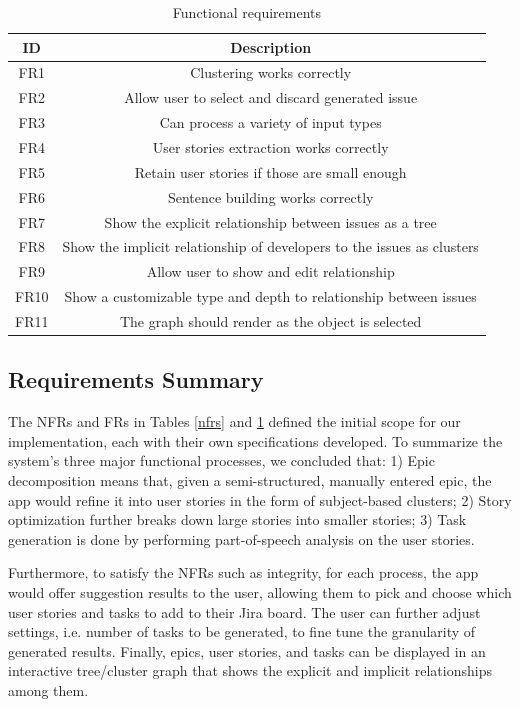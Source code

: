 \begin{table}
\centering
\caption{Functional requirements}
\label{frt}
\begin{tabular}{ |c|c| } 
\hline
\multicolumn{1}{|c|}{\textbf{ID}} & \multicolumn{1}{c|}{\textbf{Description}} \\
\hline
FR1 & Clustering works correctly \\
\hline
FR2 & Allow user to select and discard generated issue \\
\hline
FR3 & Can process a variety of input types \\
\hline
FR4 & User stories extraction works correctly \\
\hline
FR5 & Retain user stories if those are small enough \\
\hline
FR6 & Sentence building works correctly \\
\hline
FR7 & Show the explicit relationship between issues as a tree \\
\hline
FR8 & Show the implicit relationship of developers to the issues as clusters \\
\hline
FR9 & Allow user to show and edit relationship \\
\hline
FR10 & Show a customizable type and depth to relationship between issues \\
\hline
FR11 & The graph should render as the object is selected \\
\hline
\end{tabular}
\end{table}

\subsection{Requirements Summary}
The NFRs and FRs in Tables \ref{nfrs} and \ref{frt} defined the initial scope for our implementation, each with their own specifications developed. To summarize the system's three major functional processes, we concluded that: 1) Epic decomposition means that, given a semi-structured, manually entered epic, the app would refine it into user stories in the form of subject-based clusters; 2) Story optimization further breaks down large stories into smaller stories; 3) Task generation is done by performing part-of-speech analysis on the user stories. 

Furthermore, to satisfy the NFRs such as integrity, for each process, the app would offer suggestion results to the user, allowing them to pick and choose which user stories and tasks to add to their Jira board. The user can further adjust settings, i.e. number of tasks to be generated, to fine tune the granularity of generated results. Finally, epics, user stories, and tasks can be displayed in an interactive tree/cluster graph that shows the explicit and implicit relationships among them.

